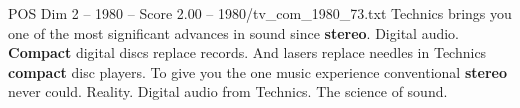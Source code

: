 \begin{textsample}{POS Dim 2 – 1980 – Score 2.00 – 1980/tv\_com\_1980\_73.txt}  \label{ex:f2_pos_062}
Technics brings you one of the most significant advances in sound since \textbf{stereo}.
Digital audio. \textbf{Compact} digital discs replace records.
And lasers replace needles in Technics \textbf{compact} disc players.
To give you the one music experience conventional \textbf{stereo} never could.
Reality.
Digital audio from Technics.
The science of sound.

\end{textsample}
